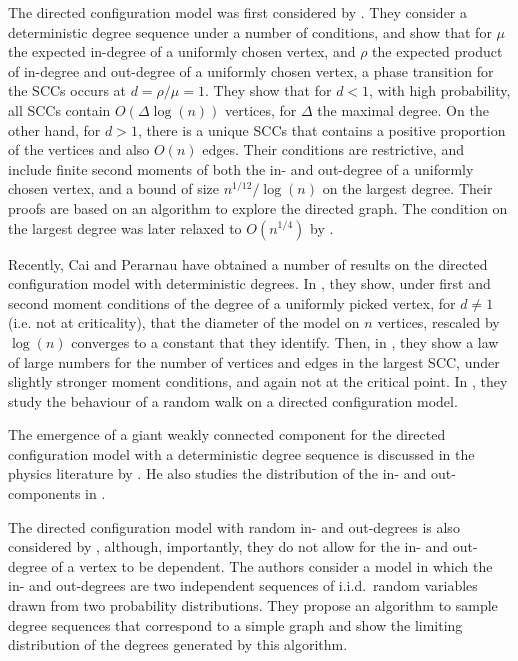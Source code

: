 The directed configuration model was first considered by \citet{cooperSizeLargestStrongly2004}. They consider a deterministic degree sequence under a number of conditions, and show that for $\mu$ the expected in-degree of a uniformly chosen vertex, and $\rho$ the expected product of in-degree and out-degree of a uniformly chosen vertex, a phase transition for the SCCs occurs at $d=\rho/\mu=1$. They show that for $d<1$, with high probability, all SCCs contain $O(\Delta\log(n))$ vertices, for $\Delta$ the maximal degree. On the other hand, for $d>1$, there is a unique SCCs that contains a positive proportion of the vertices and also $O(n)$ edges. Their conditions are restrictive, and include finite second moments of both the in- and out-degree of a uniformly chosen vertex, and a bound of size $n^{1/12}/\log(n)$ on the largest degree. Their proofs are based on an algorithm to explore the directed graph. The condition on the largest degree was later relaxed to $O(n^{1/4})$ by \citet{Graf2016}.

Recently, Cai and Perarnau have obtained a number of results on the directed configuration model with deterministic degrees. In \cite{caiDiameterDirectedConfiguration2020}, they show, under first and second moment conditions of the degree of a uniformly picked vertex, for $d\neq 1$ (i.e. not at criticality), that the diameter of the model on $n$ vertices, rescaled by $\log(n)$ converges to a constant that they identify. Then, in \cite{caiGiantComponentDirected2020}, they show a law of large numbers for the number of vertices and edges in the largest SCC, under slightly stronger moment conditions, and again not at the critical point. In \cite{cai2021rw}, they study the behaviour of a random walk on a directed configuration model.
 
The emergence of a giant weakly connected component for the directed configuration model with a deterministic degree sequence is discussed in the physics literature by \citet{Kryven2016}. He also studies the distribution of the in- and out-components in \cite{Kryven2017}.

The directed configuration model with random in- and out-degrees is also considered by \citet{Chen2012}, although, importantly, they do not allow for the in- and out-degree of a vertex to be dependent. The authors consider a model in which the in- and out-degrees are two independent sequences of i.i.d.\ random variables drawn from two probability distributions. They propose an algorithm to sample degree sequences that correspond to a simple graph and show the limiting distribution of the degrees generated by this algorithm. 


